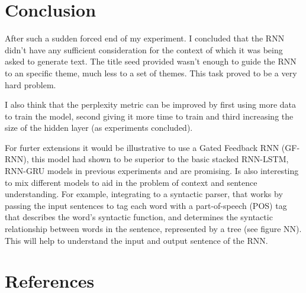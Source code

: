 \documentclass{article} %
\begin{document}
\section{Conclusion}
After such a sudden forced end of my experiment. I concluded that the RNN didn't
have any sufficient consideration for the context of which it was being asked to
generate text. The title seed provided wasn't enough to guide the RNN to an
specific theme, much less to a set of themes. This task proved to be a very hard
problem.

I also think that the perplexity metric can be improved by first using more
data to train the model, second giving it more time to train and third
increasing the size of the hidden layer (as experiments concluded).

For furter extensions it would be illustrative to use a Gated Feedback RNN (GF-RNN),
this model had shown to be superior to the basic stacked RNN-LSTM, RNN-GRU
models in previous experiments and are promising. Is also interesting to mix
different models to aid in the problem of context and sentence understanding.
For example, integrating to a syntactic parser, that works by passing the input
sentences to tag each word with a part-of-speech (POS) tag that describes the
word's syntactic function, and determines the syntactic relationship between
words in the sentence, represented by a tree (see figure NN). This will help to
understand the input and output sentence of the RNN.


\section{References}
\end{document}
